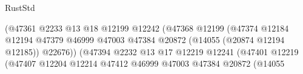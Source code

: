 \begin{lexlean}{RustStd}
\begin{coremodule}
                                                              (@47361
                                                                @2233
                                                                @13
                                                                @18
                                                                @12199
                                                                @12242
                                                                (@47368
                                                                  @12199
                                                                  (@47374
                                                                    @12184
                                                                    @12194
                                                                    @47379
                                                                    @46999
                                                                    @47003
                                                                    @47384
                                                                    @20872
                                                                    (@14055 (@20874 @12194 @12185))
                                                                    @22676))
                                                                (@47394
                                                                  @2232
                                                                  @13
                                                                  @17
                                                                  @12219
                                                                  @12241
                                                                  (@47401
                                                                    @12219
                                                                    (@47407
                                                                      @12204
                                                                      @12214
                                                                      @47412
                                                                      @46999
                                                                      @47003
                                                                      @47384
                                                                      @20872
                                                                      (@14055

\end{coremodule}
\end{lexlean}
